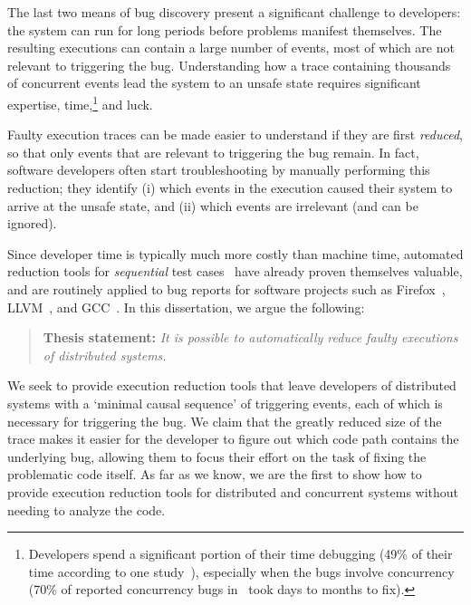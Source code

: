 The last two means of bug discovery present a significant challenge to
developers: the system can run for
long periods before problems manifest themselves. The resulting executions
can contain a large number of events, most of which are not relevant to triggering the
bug. Understanding how a trace containing thousands of concurrent events lead
the system to an unsafe state requires significant expertise, time,\footnote{Developers spend a significant portion of their time
debugging (49\% of their time according to one
study~\cite{LaToza:2006:MMM:1134285.1134355}), especially when the bugs
involve concurrency (70\% of reported concurrency bugs
in~\cite{msoft_concurrency} took days to months to fix).}
and luck.


Faulty execution traces can be made %
easier to understand if they are first
{\em reduced}, so that only events that are relevant to triggering the bug remain.
In fact, software developers often start troubleshooting by manually performing this
reduction; they identify
(i) which events in the execution caused their system to arrive at the unsafe
state, and (ii) which events are irrelevant (and can be ignored).

Since developer time is typically much more costly than machine time,
automated reduction tools for {\em sequential}
test
cases~\cite{claessen2000quickcheck,Zeller:2002:SIF:506201.506206,yang2011finding}
have already proven themselves valuable,
and are routinely applied to bug reports for software projects such as Firefox~\cite{firefox_reduction}, LLVM~\cite{bugpoint}, and GCC~\cite{gcc_reduction}.
In this dissertation, we argue the following:

\begin{quote}
{\textbf{Thesis statement:}} \textit{It is possible to automatically reduce faulty
executions of distributed systems.}
\end{quote}

We seek to provide execution reduction tools that leave developers of
distributed systems with a `minimal causal sequence' of triggering events, each of which is necessary for triggering the bug.
We claim that the greatly reduced size of the trace makes it easier for the developer to figure out which code path contains the underlying bug, allowing them to focus their effort on the task of fixing the problematic code itself.
As far as we know, we are the first to show how to provide execution
reduction tools
for distributed and concurrent systems without needing to analyze the code.

